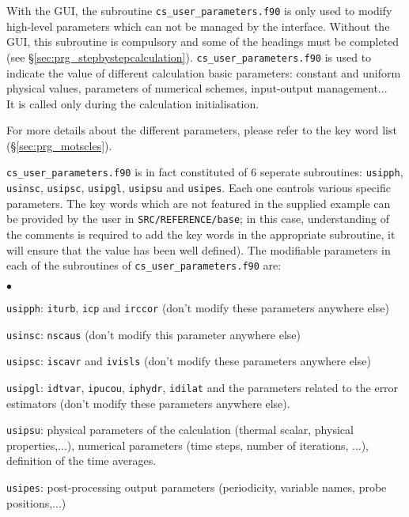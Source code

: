 {{With the GUI, the subroutine \texttt{cs\_user\_parameters.f90} is only
used to modify high-level parameters which can not be managed by the
interface. Without the GUI, this
subroutine is compulsory and some of the headings must be completed (see \S\ref{sec:prg_stepbystepcalculation}).
\texttt{cs\_user\_parameters.f90}
is used to indicate the value of different calculation
basic parameters: constant and uniform physical values, parameters of
numerical schemes, input-output management...\\
It is called only during the calculation initialisation.

For more details about the different parameters, please refer to the key
word list (\S\ref{sec:prg_motscles}).

\texttt{cs\_user\_parameters.f90} is in fact constituted of 6 seperate subroutines:  \texttt{usipph},
 \texttt{usinsc}, \texttt{usipsc}, \texttt{usipgl},
\texttt{usipsu} and \texttt{usipes}. Each one controls various
 specific parameters. The key words which are not featured in the supplied example
can be provided by the user in \texttt{SRC/REFERENCE/base}; in this case,
understanding of the comments is required to add the key words in the appropriate
subroutine, it will ensure that the value
has been well defined). The modifiable parameters in each of the subroutines of
\texttt{cs\_user\_parameters.f90} are:

\begin{list}{$\bullet$}{}
\item \texttt{usipph}: \texttt{iturb}, \texttt{icp} and \texttt{irccor} (don't modify these
      parameters anywhere else)
\item \texttt{usinsc}: \texttt{nscaus} (don't modify this parameter anywhere
      else)
\item \texttt{usipsc}: \texttt{iscavr} and \texttt{ivisls} (don't modify these
      parameters anywhere else)
\item \texttt{usipgl}: \texttt{idtvar}, \texttt{ipucou}, \texttt{iphydr}, \texttt{idilat} and the
      parameters related to the error estimators (don't modify these parameters
      anywhere else).
\item \texttt{usipsu}: physical parameters of the calculation (thermal scalar, physical
      properties,...), numerical parameters (time steps, number of iterations, ...),
      definition of the time averages.
\item \texttt{usipes}: post-processing output parameters (periodicity, variable names,
      probe positions,...)
\end{list}

}}
